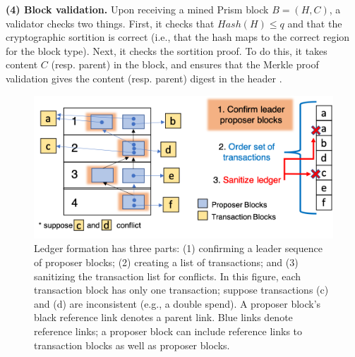 \noindent \textbf{(4) Block validation.}
Upon  receiving a mined Prism block $B=(H,C)$, a validator checks two things. 
First, it  checks that $Hash( H) \leq q$ and that the cryptographic sortition is correct  (i.e., that the hash  maps to the correct region for the block type).
Next, it checks the sortition proof.  
To do this, it takes content $C$ (resp. parent) in  the block, and ensures that the Merkle proof validation gives the content (resp. parent) digest in the header \cite{merkle}. 


\begin{figure}
   \centering
   \includegraphics[width=\linewidth]{figures/ledger_generation.png}
    \caption{\small Ledger formation has three parts:  
   (1)  confirming a leader  sequence of proposer blocks;
   (2)  creating a list  of transactions;
   and (3) sanitizing the transaction list for conflicts. 
   In this figure, each transaction  block has only one transaction; suppose transactions  (c) and (d) are inconsistent (e.g., a double spend).
   A proposer block's black reference link denotes a parent link. 
    Blue links denote reference links; a proposer block can include reference links to transaction blocks as well as proposer blocks.}
   \label{fig:leader_ledger}

 \end{figure}


